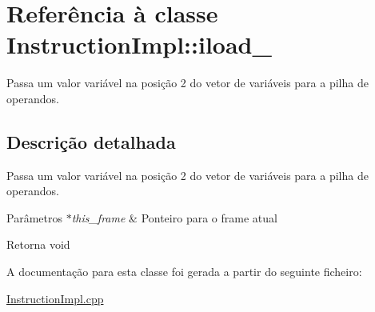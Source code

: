 \hypertarget{class_instruction_impl_1_1iload__2}{}\section{Referência à classe Instruction\+Impl\+:\+:iload\+\_}
\label{class_instruction_impl_1_1iload__2}


Passa um valor variável na posição 2 do vetor de variáveis para a pilha de operandos.  




\subsection{Descrição detalhada}
Passa um valor variável na posição 2 do vetor de variáveis para a pilha de operandos. 


\begin{DoxyParams}{Parâmetros}
{\em $\ast$this\+\_\+frame} & Ponteiro para o frame atual \\
\hline
\end{DoxyParams}
\begin{DoxyReturn}{Retorna}
void 
\end{DoxyReturn}


A documentação para esta classe foi gerada a partir do seguinte ficheiro\+:\begin{DoxyCompactItemize}
\item 
\hyperlink{_instruction_impl_8cpp}{Instruction\+Impl.\+cpp}\end{DoxyCompactItemize}
